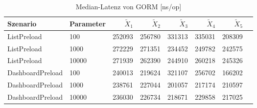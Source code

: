 
\begin{table}[ht]
\setlength{\extrarowheight}{-1pt}
\centering
\caption{Median-Latenz von GORM [ns/op]}
\begin{tabular}{llrrrrrr}
\toprule
Szenario & Parameter & ${\tilde{X}_1}$ & ${\tilde{X}_2}$ & ${\tilde{X}_3}$ & ${\tilde{X}_4}$ & ${\tilde{X}_5}$ \\
\midrule
	ListPreload & 100 & 252093 & 256780 & 331313 & 335031 & 208309 \\
	ListPreload & 1000 & 272229 & 271351 & 234452 & 249782 & 242575 \\
	ListPreload & 10000 & 271939 & 262390 & 244910 & 260218 & 245326 \\
	DashboardPreload & 100 & 240013 & 219624 & 321107 & 256702 & 166202 \\
	DashboardPreload & 1000 & 238761 & 227044 & 201057 & 217174 & 210597 \\
	DashboardPreload & 10000 & 236030 & 226734 & 218671 & 229858 & 217025 \\
\bottomrule
\end{tabular}
\label{tab:durchsatz_gorm}
\end{table}
	